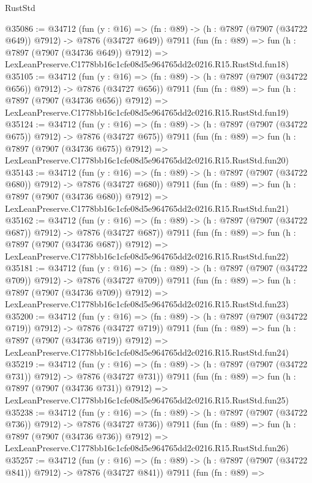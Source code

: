 \begin{lexlean}{RustStd}
\begin{coremodule}
@35086 := @34712
    (fun (y : @16) => (fn : @89) -> (h : @7897 (@7907 (@34722 @649)) @7912) -> @7876 (@34727 @649))
    @7911
    (fun (fn : @89) =>
    fun (h : @7897 (@7907 (@34736 @649)) @7912) =>
    LexLeanPreserve.C1778bb16c1cfe08d5e964765dd2c0216.R15.RustStd.fun18)
@35105 := @34712
    (fun (y : @16) => (fn : @89) -> (h : @7897 (@7907 (@34722 @656)) @7912) -> @7876 (@34727 @656))
    @7911
    (fun (fn : @89) =>
    fun (h : @7897 (@7907 (@34736 @656)) @7912) =>
    LexLeanPreserve.C1778bb16c1cfe08d5e964765dd2c0216.R15.RustStd.fun19)
@35124 := @34712
    (fun (y : @16) => (fn : @89) -> (h : @7897 (@7907 (@34722 @675)) @7912) -> @7876 (@34727 @675))
    @7911
    (fun (fn : @89) =>
    fun (h : @7897 (@7907 (@34736 @675)) @7912) =>
    LexLeanPreserve.C1778bb16c1cfe08d5e964765dd2c0216.R15.RustStd.fun20)
@35143 := @34712
    (fun (y : @16) => (fn : @89) -> (h : @7897 (@7907 (@34722 @680)) @7912) -> @7876 (@34727 @680))
    @7911
    (fun (fn : @89) =>
    fun (h : @7897 (@7907 (@34736 @680)) @7912) =>
    LexLeanPreserve.C1778bb16c1cfe08d5e964765dd2c0216.R15.RustStd.fun21)
@35162 := @34712
    (fun (y : @16) => (fn : @89) -> (h : @7897 (@7907 (@34722 @687)) @7912) -> @7876 (@34727 @687))
    @7911
    (fun (fn : @89) =>
    fun (h : @7897 (@7907 (@34736 @687)) @7912) =>
    LexLeanPreserve.C1778bb16c1cfe08d5e964765dd2c0216.R15.RustStd.fun22)
@35181 := @34712
    (fun (y : @16) => (fn : @89) -> (h : @7897 (@7907 (@34722 @709)) @7912) -> @7876 (@34727 @709))
    @7911
    (fun (fn : @89) =>
    fun (h : @7897 (@7907 (@34736 @709)) @7912) =>
    LexLeanPreserve.C1778bb16c1cfe08d5e964765dd2c0216.R15.RustStd.fun23)
@35200 := @34712
    (fun (y : @16) => (fn : @89) -> (h : @7897 (@7907 (@34722 @719)) @7912) -> @7876 (@34727 @719))
    @7911
    (fun (fn : @89) =>
    fun (h : @7897 (@7907 (@34736 @719)) @7912) =>
    LexLeanPreserve.C1778bb16c1cfe08d5e964765dd2c0216.R15.RustStd.fun24)
@35219 := @34712
    (fun (y : @16) => (fn : @89) -> (h : @7897 (@7907 (@34722 @731)) @7912) -> @7876 (@34727 @731))
    @7911
    (fun (fn : @89) =>
    fun (h : @7897 (@7907 (@34736 @731)) @7912) =>
    LexLeanPreserve.C1778bb16c1cfe08d5e964765dd2c0216.R15.RustStd.fun25)
@35238 := @34712
    (fun (y : @16) => (fn : @89) -> (h : @7897 (@7907 (@34722 @736)) @7912) -> @7876 (@34727 @736))
    @7911
    (fun (fn : @89) =>
    fun (h : @7897 (@7907 (@34736 @736)) @7912) =>
    LexLeanPreserve.C1778bb16c1cfe08d5e964765dd2c0216.R15.RustStd.fun26)
@35257 := @34712
    (fun (y : @16) => (fn : @89) -> (h : @7897 (@7907 (@34722 @841)) @7912) -> @7876 (@34727 @841))
    @7911
    (fun (fn : @89) =>

\end{coremodule}
\end{lexlean}

